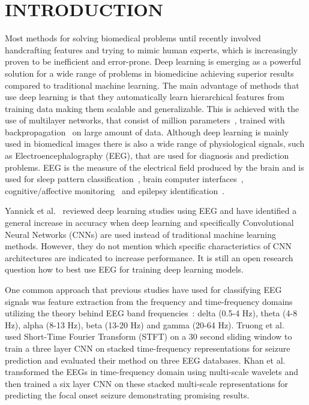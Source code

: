 \documentclass[conference]{IEEEtran}
\begin{document}
\section{INTRODUCTION}
Most methods for solving biomedical problems until recently involved handcrafting features and trying to mimic human experts, which is increasingly proven to be inefficient and error-prone.
Deep learning is emerging as a powerful solution for a wide range of problems in biomedicine achieving superior results compared to traditional machine learning.
The main advantage of methods that use deep learning is that they automatically learn hierarchical features from training data making them scalable and generalizable.
This is achieved with the use of multilayer networks, that consist of million parameters~\cite{krizhevsky2012imagenet}, trained with backpropagation~\cite{rumelhart1986learning} on large amount of data.
Although deep learning is mainly used in biomedical images there is also a wide range of physiological signals, such as Electroencephalography (EEG), that are used for diagnosis and prediction problems.
EEG is the measure of the electrical field produced by the brain and is used for sleep pattern classification~\cite{aboalayon2016sleep}, brain computer interfaces~\cite{al2017review}, cognitive/affective monitoring~\cite{lotte1999electroencephalography} and epilepsy identification~\cite{acharya2013automated}.

Yannick et al.~\cite{yannick2019deep} reviewed deep learning studies using EEG and have identified a general increase in accuracy when deep learning and specifically Convolutional Neural Networks (CNNs) are used instead of traditional machine learning methods.
However, they do not mention which specific characteristics of CNN architectures are indicated to increase performance.
It is still an open research question how to best use EEG for training deep learning models.

One common approach that previous studies have used for classifying EEG signals was feature extraction from the frequency and time-frequency domains utilizing the theory behind EEG band frequencies~\cite{langkvist2012sleep}: delta (0.5-4 Hz), theta (4-8 Hz), alpha (8-13 Hz), beta (13-20 Hz) and gamma (20-64 Hz).
Truong et al.~\cite{truong2018convolutional} used Short-Time Fourier Transform (STFT) on a 30 second sliding window to train a three layer CNN on stacked time-frequency representations for seizure prediction and evaluated their method on three EEG databases.
Khan et al.~\cite{khan2018focal} transformed the EEGs in time-frequency domain using multi-scale wavelets and then trained a six layer CNN on these stacked multi-scale representations for predicting the focal onset seizure demonstrating promising results.
\end{document}

